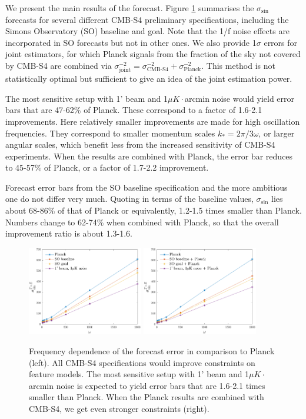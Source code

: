 We present the main results of the forecast. Figure \ref{forecast omega dependence pol} summarises the $\sigma_{\sin}$ forecasts for several different CMB-S4 preliminary specifications, including the Simons Observatory (SO) baseline and goal. Note that the 1/f noise effects are incorporated in SO forecasts but not in other ones. We also provide 1$\sigma$ errors for joint estimators, for which Planck signals from the fraction of the sky not covered by CMB-S4 are combined via $\sigma_\text{joint}^{-2} = \sigma_\text{CMB-S4}^{-2} +  \sigma_\text{Planck}^{-2}$. This method is not statistically optimal but sufficient to give an idea of the joint estimation power.

The most sensitive setup with 1' beam and 1$\mu K \cdot$arcmin noise would yield error bars that are 47-62\% of Planck. These correspond to a factor of 1.6-2.1 improvements. Here relatively smaller improvements are made for high oscillation frequencies. They correspond to smaller momentum scales $k_\ast = 2\pi/3\omega$, or larger angular scales, which benefit less from the increased sensitivity of CMB-S4 experiments. When the results are combined with Planck, the error bar reduces to 45-57\% of Planck, or a factor of 1.7-2.2 improvement.

Forecast error bars from the SO baseline specification and the more ambitious one do not differ very much. Quoting in terms of the baseline values, $\sigma_{\sin}$ lies about 68-86\% of that of Planck or equivalently, 1.2-1.5 times smaller than Planck. Numbers change to 62-74\% when combined with Planck, so that the overall improvement ratio is about 1.3-1.6.

\begin{figure}[ht]
	\centering
	\includegraphics[width=0.45\textwidth]{omega_dependence_pol.pdf}
	\includegraphics[width=0.45\textwidth]{omega_dependence_combined_pol.pdf}
	\caption{Frequency dependence of the forecast error in comparison to Planck (left). All CMB-S4 specifications would improve constraints on feature models. The most sensitive setup with 1' beam and 1$\mu K \cdot$arcmin noise is expected to yield error bars that are 1.6-2.1 times smaller than Planck. When the Planck results are combined with CMB-S4, we get even stronger constraints (right).}
	\label{forecast omega dependence pol}
\end{figure}

